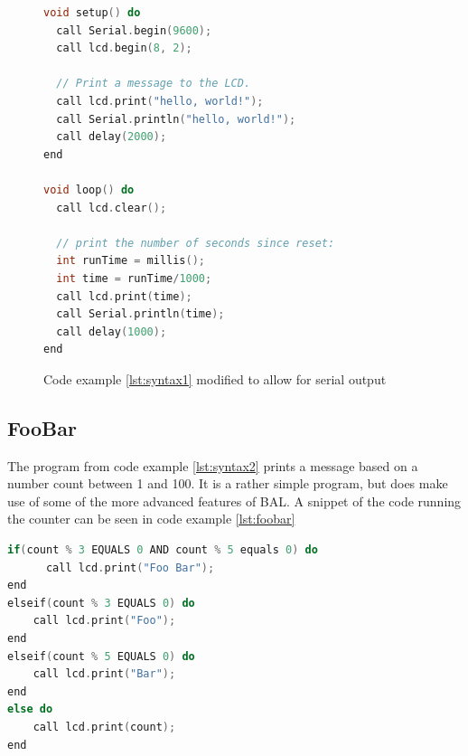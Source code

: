 \begin{figure}[h!]
\begin{lstlisting}[caption=Hello World with serial output, language={C++},label=lst:serial]
void setup() do
  call Serial.begin(9600);
  call lcd.begin(8, 2);

  // Print a message to the LCD.
  call lcd.print("hello, world!");
  call Serial.println("hello, world!");
  call delay(2000);
end

void loop() do
  call lcd.clear();

  // print the number of seconds since reset:
  int runTime = millis();
  int time = runTime/1000;
  call lcd.print(time);
  call Serial.println(time);
  call delay(1000);
end
\end{lstlisting}
\caption{Code example \ref{lst:syntax1} modified to allow for serial output}
\end{figure}
\pagebreak
\subsection*{FooBar}
The program from code example \ref{lst:syntax2} prints a message based on a number count between 1 and 100. It is a rather simple program, but does make use of some of the more advanced features of BAL. A snippet of the code running the counter can be seen in code example \ref{lst:foobar}
\begin{lstlisting}[caption=Hello World with serial output,firstnumber=26, language={C++},label=lst:foobar]
if(count % 3 EQUALS 0 AND count % 5 equals 0) do
      call lcd.print("Foo Bar"); 
end
elseif(count % 3 EQUALS 0) do
    call lcd.print("Foo");
end
elseif(count % 5 EQUALS 0) do
    call lcd.print("Bar");
end
else do
    call lcd.print(count);
end
\end{lstlisting}

